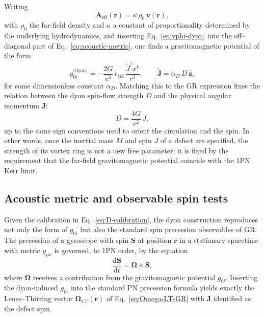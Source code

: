 \documentclass[11pt]{article}
\newcommand{\dd}{\mathrm{d}}
\begin{document}
Writing
\begin{equation}
  \mathbf{A}_{\text{eff}}(\mathbf{r})
  = \kappa\,\rho_0\,\mathbf{v}(\mathbf{r}),
\end{equation}
with $\rho_0$ the far-field density and $\kappa$ a constant of
proportionality determined by the underlying hydrodynamics, and
inserting Eq.~\eqref{eq:vphi-dyon} into the off–diagonal part of
Eq.~\eqref{eq:acoustic-metric}, one finds a gravitomagnetic potential
of the form
\begin{equation}
  g_{0i}^{\text{(dyon)}}
  = -\frac{2G}{c^3}\,
    \epsilon_{ijk}\,\frac{\tilde{J}^j x^k}{r^3},
  \qquad
  \tilde{\mathbf{J}}
  = \alpha_D\,D\,\hat{\mathbf{z}},
\end{equation}
for some dimensionless constant $\alpha_D$.
Matching this to the GR expression fixes the relation between the
dyon spin-flow strength $D$ and the physical angular momentum
$\mathbf{J}$:
\begin{equation}
  D = \frac{4G}{c^2}\,J,
  \label{eq:D-calibration}
\end{equation}
up to the same sign conventions used to orient the circulation and
the spin.
In other words, once the inertial mass $M$ and spin $J$ of a defect
are specified, the strength of its vortex ring is not a new free
parameter: it is fixed by the requirement that the far-field
gravitomagnetic potential coincide with the 1PN Kerr limit.

\subsection{Acoustic metric and observable spin tests}
\label{subsec:spin-observables}

Given the calibration in Eq.~\eqref{eq:D-calibration}, the dyon
construction reproduces not only the form of $g_{0i}$ but also the
standard spin precession observables of GR.
The precession of a gyroscope with spin $\mathbf{S}$ at position
$\mathbf{r}$ in a stationary spacetime with metric $g_{\mu\nu}$ is
governed, to 1PN order, by the equation
\begin{equation}
  \frac{\dd\mathbf{S}}{\dd t}
  = \bm{\Omega}\times\mathbf{S},
\end{equation}
where $\bm{\Omega}$ receives a contribution from the
gravitomagnetic potential $g_{0i}$.
Inserting the dyon-induced $g_{0i}$ into the standard PN precession
formula yields exactly the Lense--Thirring vector
$\bm{\Omega}_{\text{LT}}(\mathbf{r})$ of Eq.~\eqref{eq:Omega-LT-GR}
with $\mathbf{J}$ identified as the defect spin.
\end{document}
